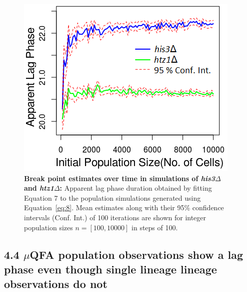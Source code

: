 \documentclass{bioinfo}
\begin{document}
{\setcounter{figure}{17}
\vspace{-2em}
\begin{figure}[H]
\centering
\includegraphics[width=0.8\linewidth]{Ch2ApparentLags.png}
\caption{\footnotesize{\textbf{Break point estimates over time in simulations of \textit{his3}$\Delta$ and \textit{htz1}$\Delta$:} Apparent lag phase duration obtained by fitting Equation 7 to the population simulations generated using Equation~\ref{eq:8}. Mean estimates along with their 95\% confidence intervals (Conf. Int.) of 100 iterations are shown for integer population sizes $n=[100,10000]$ in steps of 100.}}
\label{fig:ApparentLag2}
\end{figure}
\vspace{-3.5em}

\vspace{-0.5em}
\subsection*{4.4 $\mu$QFA population observations show a lag phase even though single lineage lineage observations do not}

}
\end{document}
